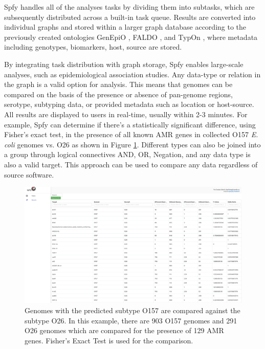 \documentclass{article}
\begin{document}
Spfy handles all of the analyses tasks by dividing them into subtasks, which are subsequently distributed across a built-in task queue. Results are converted into individual graphs and stored within a larger graph database according to the previously created ontologies GenEpiO \cite{griffiths2017context}, FALDO \cite{bolleman2016faldo}, and TypOn \cite{vaz2014typon}, where metadata including genotypes, biomarkers, host, source are stored.

By integrating task distribution with graph storage, Spfy enables large-scale analyses, such as epidemiological association studies. Any data-type or relation in the graph is a valid option for analysis. This means that genomes can be compared on the basis of the presence or absence of pan-genome regions, serotype, subtyping data, or provided metadata such as location or host-source. All results are displayed to users in real-time, usually within 2-3 minutes.
For example, Spfy can determine if there's a statistically significant difference, using Fisher's exact test, in the presence of all known AMR genes in collected O157 \textit{E. coli} genomes vs. O26 as shown in Figure \ref{fig-groupings}.
Different types can also be joined into a group through logical connectives AND, OR, Negation, and any data type is also a valid target. This approach can be used to compare any data regardless of source software.

\begin{figure}[!hb]
\begin{center}
\includegraphics[width=\textwidth]{images/o157vo26_amrgenes}
\end{center}
\caption{
Genomes with the predicted subtype O157 are compared against the subtype O26. In this example, there are 903 O157 genomes and 291 O26 genomes which are compared for the presence of 129 AMR genes. Fisher's Exact Test is used for the comparison.}
\label{fig-groupings}
\end{figure}
\end{document}
